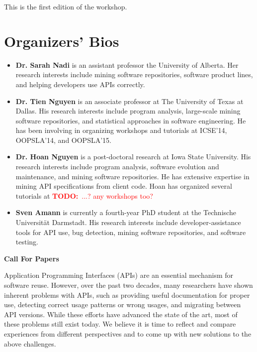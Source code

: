 \documentclass[10pt, conference]{IEEEtran}
\newcommand{\todo}[1]{{\textcolor{red}{\textbf{TODO:}~#1}}}
\begin{document}
This is the first edition of the workshop.

\section{Organizers' Bios}
\begin{itemize}
\item \textbf{Dr. Sarah Nadi} is an assistant professor the University of Alberta. Her research interests include mining software repositories, software product lines, and helping developers use APIs correctly.

\item \textbf{Dr. Tien Nguyen} is an associate professor at The University of Texas at Dallas. His research interests include program analysis, large-scale mining software repositories, and statistical approaches in software engineering. He has been involving in organizing workshops and tutorials at ICSE’14, OOPSLA’14, and OOPSLA’15.

\item \textbf{Dr. Hoan Nguyen} is a post-doctoral research at Iowa State University. His research interests include program analysis, software evolution and maintenance, and mining software repositories. He has extensive expertise in mining API specifications from client code. Hoan has organized several tutorials at \todo{...? any workshops too?}

\item \textbf{Sven Amann} is currently a fourth-year PhD student at the Technische Universit\"{a}t Darmstadt. His research interests include developer-assistance tools for API use, bug detection, mining software repositories, and software testing.
\end{itemize}




\newpage
\onecolumn

\begin{center}
\Large{\textbf{Call For Papers}}
\end{center}

Application Programming Interfaces (APIs) are an essential mechanism for software reuse. However, over the past two decades, many researchers have shown inherent problems with APIs, such as providing useful documentation for proper use, detecting correct usage patterns or wrong usages, and migrating between API versions. While these efforts have advanced the state of the art, most of these problems still exist today. We believe it is time to reflect and compare experiences from different perspectives and to come up with new solutions to the above challenges. 
\end{document}
